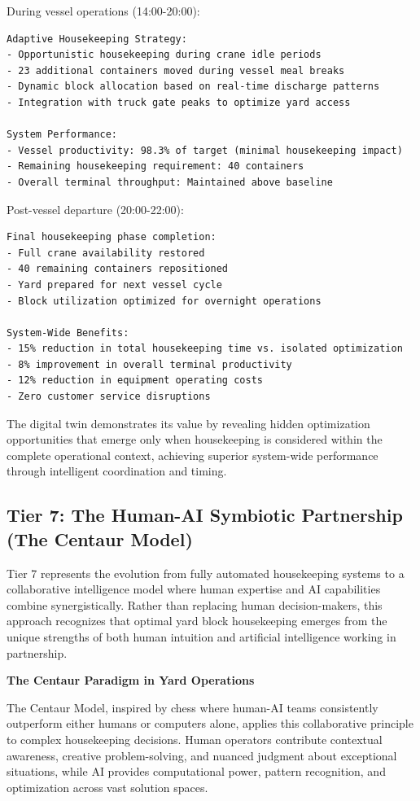 \documentclass{article}
\begin{document}
During vessel operations (14:00-20:00):
\begin{verbatim}
Adaptive Housekeeping Strategy:
- Opportunistic housekeeping during crane idle periods
- 23 additional containers moved during vessel meal breaks
- Dynamic block allocation based on real-time discharge patterns
- Integration with truck gate peaks to optimize yard access

System Performance:
- Vessel productivity: 98.3% of target (minimal housekeeping impact)
- Remaining housekeeping requirement: 40 containers
- Overall terminal throughput: Maintained above baseline
\end{verbatim}

Post-vessel departure (20:00-22:00):
\begin{verbatim}
Final housekeeping phase completion:
- Full crane availability restored
- 40 remaining containers repositioned
- Yard prepared for next vessel cycle
- Block utilization optimized for overnight operations

System-Wide Benefits:
- 15% reduction in total housekeeping time vs. isolated optimization
- 8% improvement in overall terminal productivity
- 12% reduction in equipment operating costs
- Zero customer service disruptions
\end{verbatim}

The digital twin demonstrates its value by revealing hidden optimization opportunities that emerge only when housekeeping is considered within the complete operational context, achieving superior system-wide performance through intelligent coordination and timing.

\subsection{Tier 7: The Human-AI Symbiotic Partnership (The Centaur Model)}

Tier 7 represents the evolution from fully automated housekeeping systems to a collaborative intelligence model where human expertise and AI capabilities combine synergistically. Rather than replacing human decision-makers, this approach recognizes that optimal yard block housekeeping emerges from the unique strengths of both human intuition and artificial intelligence working in partnership.

\textbf{The Centaur Paradigm in Yard Operations}

The Centaur Model, inspired by chess where human-AI teams consistently outperform either humans or computers alone, applies this collaborative principle to complex housekeeping decisions. Human operators contribute contextual awareness, creative problem-solving, and nuanced judgment about exceptional situations, while AI provides computational power, pattern recognition, and optimization across vast solution spaces.
\end{document}
